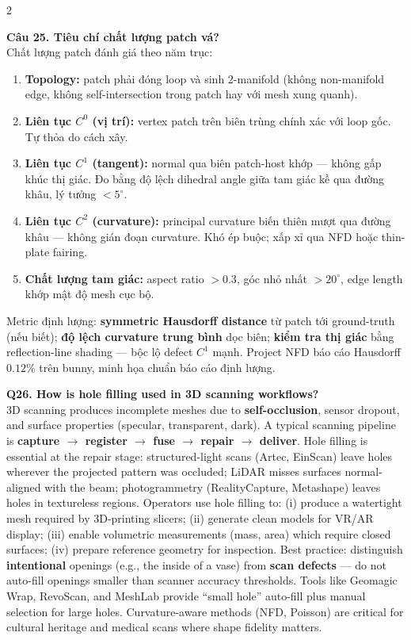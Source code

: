\begin{paracol}{2}
\switchcolumn

\textbf{Câu 25. Tiêu chí chất lượng patch vá?}\\
Chất lượng patch đánh giá theo năm trục:
\begin{enumerate}[leftmargin=*,nosep]
\item \textbf{Topology:} patch phải đóng loop và sinh 2-manifold (không non-manifold edge, không self-intersection trong patch hay với mesh xung quanh).
\item \textbf{Liên tục $C^0$ (vị trí):} vertex patch trên biên trùng chính xác với loop gốc. Tự thỏa do cách xây.
\item \textbf{Liên tục $C^1$ (tangent):} normal qua biên patch-host khớp — không gấp khúc thị giác. Đo bằng độ lệch dihedral angle giữa tam giác kề qua đường khâu, lý tưởng $< 5^\circ$.
\item \textbf{Liên tục $C^2$ (curvature):} principal curvature biến thiên mượt qua đường khâu — không gián đoạn curvature. Khó ép buộc; xấp xỉ qua NFD hoặc thin-plate fairing.
\item \textbf{Chất lượng tam giác:} aspect ratio $> 0.3$, góc nhỏ nhất $> 20^\circ$, edge length khớp mật độ mesh cục bộ.
\end{enumerate}
Metric định lượng: \textbf{symmetric Hausdorff distance} từ patch tới ground-truth (nếu biết); \textbf{độ lệch curvature trung bình} dọc biên; \textbf{kiểm tra thị giác} bằng reflection-line shading — bộc lộ defect $C^1$ mạnh. Project NFD báo cáo Hausdorff $0.12\%$ trên bunny, minh họa chuẩn báo cáo định lượng.

\switchcolumn*

\textbf{Q26. How is hole filling used in 3D scanning workflows?}\\
3D scanning produces incomplete meshes due to \textbf{self-occlusion}, sensor dropout, and surface properties (specular, transparent, dark). A typical scanning pipeline is \textbf{capture $\to$ register $\to$ fuse $\to$ repair $\to$ deliver}. Hole filling is essential at the repair stage: structured-light scans (Artec, EinScan) leave holes wherever the projected pattern was occluded; LiDAR misses surfaces normal-aligned with the beam; photogrammetry (RealityCapture, Metashape) leaves holes in textureless regions. Operators use hole filling to: (i) produce a watertight mesh required by 3D-printing slicers; (ii) generate clean models for VR/AR display; (iii) enable volumetric measurements (mass, area) which require closed surfaces; (iv) prepare reference geometry for inspection. Best practice: distinguish \textbf{intentional} openings (e.g., the inside of a vase) from \textbf{scan defects} — do not auto-fill openings smaller than scanner accuracy thresholds. Tools like Geomagic Wrap, RevoScan, and MeshLab provide ``small hole'' auto-fill plus manual selection for large holes. Curvature-aware methods (NFD, Poisson) are critical for cultural heritage and medical scans where shape fidelity matters.


\end{paracol}
